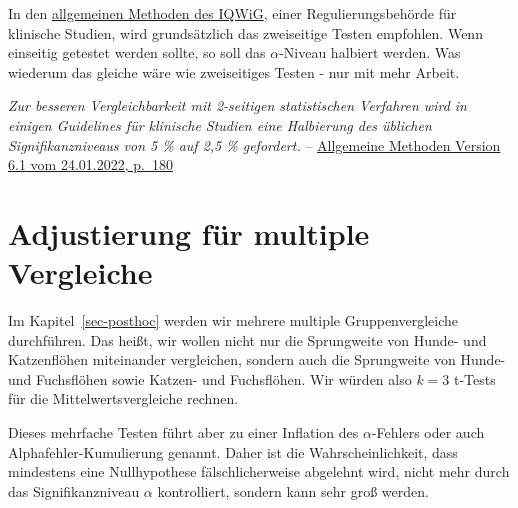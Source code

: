 \documentclass[
  letterpaper,
]{scrbook}
\begin{document}
\begin{tcolorbox}[enhanced jigsaw, coltitle=black, titlerule=0mm, bottomrule=.15mm, opacityback=0, opacitybacktitle=0.6, leftrule=.75mm, title=\textcolor{quarto-callout-note-color}{\faInfo}\hspace{0.5em}{Einseitig oder zweiseitig im Spiegel der Regulierungsbehörden}, toprule=.15mm, bottomtitle=1mm, toptitle=1mm, left=2mm, breakable, arc=.35mm, colback=white, rightrule=.15mm, colbacktitle=quarto-callout-note-color!10!white, colframe=quarto-callout-note-color-frame]
In den
\href{https://www.iqwig.de/ueber-uns/methoden/methodenpapier/}{allgemeinen
Methoden des IQWiG}, einer Regulierungsbehörde für klinische Studien,
wird grundsätzlich das zweiseitige Testen empfohlen. Wenn einseitig
getestet werden sollte, so soll das \(\alpha\)-Niveau halbiert werden.
Was wiederum das gleiche wäre wie zweiseitiges Testen - nur mit mehr
Arbeit.

\emph{Zur besseren Vergleichbarkeit mit 2-seitigen statistischen
Verfahren wird in einigen Guidelines für klinische Studien eine
Halbierung des üblichen Signifikanzniveaus von 5 \% auf 2,5 \%
gefordert.} --
\href{https://www.iqwig.de/methoden/allgemeine-methoden-v6-1.pdf}{Allgemeine
Methoden Version 6.1 vom 24.01.2022, p.~180}
\end{tcolorbox}

\hypertarget{sec-statistisches-testen-alpha-adjust}{%
\section{Adjustierung für multiple
Vergleiche}\label{sec-statistisches-testen-alpha-adjust}}

{}

Im Kapitel~\ref{sec-posthoc} werden wir mehrere multiple
Gruppenvergleiche durchführen. Das heißt, wir wollen nicht nur die
Sprungweite von Hunde- und Katzenflöhen miteinander vergleichen, sondern
auch die Sprungweite von Hunde- und Fuchsflöhen sowie Katzen- und
Fuchsflöhen. Wir würden also \(k = 3\) t-Tests für die
Mittelwertsvergleiche rechnen.

Dieses mehrfache Testen führt aber zu einer Inflation des
\(\alpha\)-Fehlers oder auch Alphafehler-Kumulierung genannt. Daher ist
die Wahrscheinlichkeit, dass mindestens eine Nullhypothese
fälschlicherweise abgelehnt wird, nicht mehr durch das Signifikanzniveau
\(\alpha\) kontrolliert, sondern kann sehr groß werden.
\end{document}
